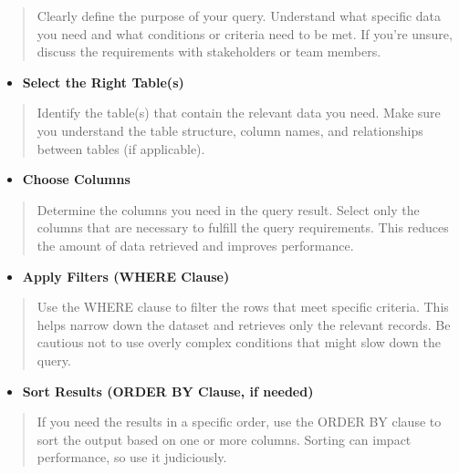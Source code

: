 \documentclass[
]{book}
\providecommand{\tightlist}{%
  \setlength{\itemsep}{0pt}\setlength{\parskip}{0pt}}
\begin{document}
\begin{quote}
Clearly define the purpose of your query. Understand what specific data you need and what conditions or criteria need to be met. If you're unsure, discuss the requirements with stakeholders or team members.
\end{quote}

\begin{itemize}
\tightlist
\item
  \textbf{Select the Right Table(s)}
\end{itemize}

\begin{quote}
Identify the table(s) that contain the relevant data you need. Make sure you understand the table structure, column names, and relationships between tables (if applicable).
\end{quote}

\begin{itemize}
\tightlist
\item
  \textbf{Choose Columns}
\end{itemize}

\begin{quote}
Determine the columns you need in the query result. Select only the columns that are necessary to fulfill the query requirements. This reduces the amount of data retrieved and improves performance.
\end{quote}

\begin{itemize}
\tightlist
\item
  \textbf{Apply Filters (WHERE Clause)}
\end{itemize}

\begin{quote}
Use the WHERE clause to filter the rows that meet specific criteria. This helps narrow down the dataset and retrieves only the relevant records. Be cautious not to use overly complex conditions that might slow down the query.
\end{quote}

\begin{itemize}
\tightlist
\item
  \textbf{Sort Results (ORDER BY Clause, if needed)}
\end{itemize}

\begin{quote}
If you need the results in a specific order, use the ORDER BY clause to sort the output based on one or more columns. Sorting can impact performance, so use it judiciously.
\end{quote}
\end{document}
